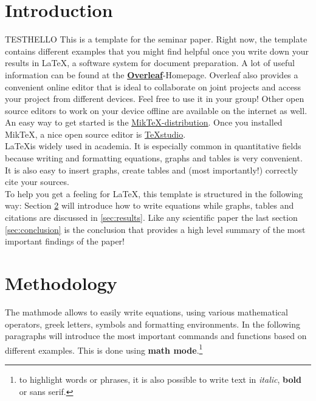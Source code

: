 \documentclass[12pt]{article}
\begin{document}

\onehalfspacing                  	

\section{Introduction}
TESTHELLO This is a template for the seminar paper. Right now, the template contains different examples that you might find helpful once you write down your results in \LaTeX, a software system for document preparation. A lot of useful information can be found at the \href{https://www.overleaf.com/learn/latex/Creating_a_document_in_LaTeX}{\textbf{Overleaf}}-Homepage. Overleaf also provides a convenient online editor that is ideal to collaborate on joint projects and access your project from different devices. Feel free to use it in your group! Other open source editors to work on your device offline are available on the internet as well. An easy way to get started is the \href{https://miktex.org/download}{\underline{MikTeX-distribution}}. Once you installed MikTeX, a nice open source editor is \href{https://www.texstudio.org/}{\underline{TeXstudio}}. \\
\LaTeX is widely used in academia. It is especially common in quantitative fields because writing and formatting equations, graphs and tables is very convenient. It is also easy to insert graphs, create tables and (most importantly!) correctly cite your sources. \\
To help you get a feeling for \LaTeX, this template is structured in the following way: Section \ref{sec:math_mode} will introduce how to write equations while graphs, tables and citations are discussed in \ref{sec:results}. Like any scientific paper the last section \ref{sec:conclusion} is the conclusion that provides a high level summary of the most important findings of the paper!

\section{Methodology}\label{sec:math_mode}
The mathmode allows to easily write equations, using various mathematical operators, greek letters, symbols and formatting environments. In the following paragraphs will introduce the most important commands and functions based on different examples. This is done using \textbf{math mode}.\footnote{to highlight words or phrases, it is also possible to write text in \textit{italic}, \textbf{bold} or \textsf{sans serif}.}
\end{document}
